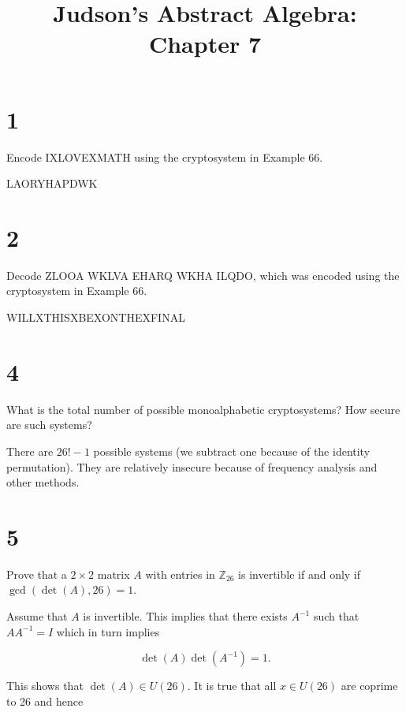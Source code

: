 \documentclass[a4paper]{article}
\title{Judson's Abstract Algebra: Chapter 7}
\date{}
\begin{document}
\maketitle


\section*{1}

Encode IXLOVEXMATH using the cryptosystem in Example 66.

\vspace{\baselineskip}

LAORYHAPDWK


\section*{2}

Decode ZLOOA WKLVA EHARQ WKHA ILQDO, which was encoded using the cryptosystem in Example 66.

\vspace{\baselineskip}

WILLXTHISXBEXONTHEXFINAL


\section*{4}

What is the total number of possible monoalphabetic cryptosystems? How secure are such systems?

\vspace{\baselineskip}

There are $26! - 1$ possible systems (we subtract one because of the identity permutation). They are relatively insecure because of frequency analysis and other methods.


\section*{5}

Prove that a  $2 \times 2$ matrix $A$ with entries in $\mathbb{Z}_{26}$ is invertible if and only if $\gcd(\det(A), 26) = 1$.

\vspace{\baselineskip}

Assume that $A$ is invertible. This implies that there exists $A^{-1}$ such that $AA^{-1} = I$ which in turn implies

$$\det(A) \det(A^{-1}) = 1.$$

This shows that $\det(A) \in U(26)$. It is true that all $x \in U(26)$ are coprime to 26 and hence 
\end{document}
